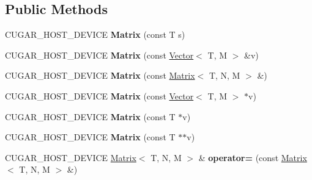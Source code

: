 \subsection*{Public Methods}
\begin{DoxyCompactItemize}
\item 
\mbox{\label{structcugar_1_1_matrix_a64822d2159dfbd975d49ab12a30bb050}} 
C\+U\+G\+A\+R\+\_\+\+H\+O\+S\+T\+\_\+\+D\+E\+V\+I\+CE {\bfseries Matrix} (const T s)
\item 
\mbox{\label{structcugar_1_1_matrix_a5bf857fa3003b30b1c03d7f8308f030d}} 
C\+U\+G\+A\+R\+\_\+\+H\+O\+S\+T\+\_\+\+D\+E\+V\+I\+CE {\bfseries Matrix} (const \hyperlink{structcugar_1_1_vector}{Vector}$<$ T, M $>$ \&v)
\item 
\mbox{\label{structcugar_1_1_matrix_aeb00a033bbd62d91fda2e5770377a9b8}} 
C\+U\+G\+A\+R\+\_\+\+H\+O\+S\+T\+\_\+\+D\+E\+V\+I\+CE {\bfseries Matrix} (const \hyperlink{structcugar_1_1_matrix}{Matrix}$<$ T, N, M $>$ \&)
\item 
\mbox{\label{structcugar_1_1_matrix_a1bcb80ab86f56a153b0707b829889eea}} 
C\+U\+G\+A\+R\+\_\+\+H\+O\+S\+T\+\_\+\+D\+E\+V\+I\+CE {\bfseries Matrix} (const \hyperlink{structcugar_1_1_vector}{Vector}$<$ T, M $>$ $\ast$v)
\item 
\mbox{\label{structcugar_1_1_matrix_ad2959725a2fc40b253277d4c0ac2816d}} 
C\+U\+G\+A\+R\+\_\+\+H\+O\+S\+T\+\_\+\+D\+E\+V\+I\+CE {\bfseries Matrix} (const T $\ast$v)
\item 
\mbox{\label{structcugar_1_1_matrix_af9e28a918f23ad79a549b813df3991fa}} 
C\+U\+G\+A\+R\+\_\+\+H\+O\+S\+T\+\_\+\+D\+E\+V\+I\+CE {\bfseries Matrix} (const T $\ast$$\ast$v)
\item 
\mbox{\label{structcugar_1_1_matrix_a9b5d06bac4b31e63b1d94a5b864307b1}} 
C\+U\+G\+A\+R\+\_\+\+H\+O\+S\+T\+\_\+\+D\+E\+V\+I\+CE \hyperlink{structcugar_1_1_matrix}{Matrix}$<$ T, N, M $>$ \& {\bfseries operator=} (const \hyperlink{structcugar_1_1_matrix}{Matrix}$<$ T, N, M $>$ \&)
\item 
\mbox{\label{structcugar_1_1_matrix_ac3507370816b194da09ce5de4f8f7e91}} 
$$
\end{DoxyCompactItemize}
